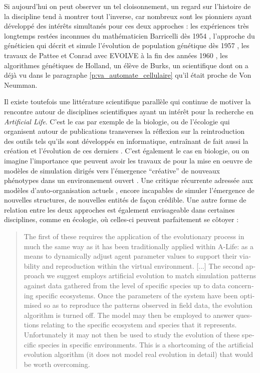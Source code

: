 Si aujourd'hui on peut observer un tel cloisonnement, un regard sur l'histoire de la discipline tend à montrer tout l'inverse, car nombreux sont les pionniers ayant développé des intérêts simultanés pour ces deux approches : les expériences très longtemps restées inconnues du mathématicien Barricelli dès 1954 , l'approche du généticien \textcite{Fraser1957} qui décrit et simule l'évolution de population génétique dès 1957 , les travaux de Pattee et Conrad avec EVOLVE à la fin des années 1960 \autocite{Conrad1970}, les algorithmes génétiques  de Holland, un élève de Burks, un scientifique dont on a déjà vu dans le paragraphe \ref{p:va_automate_cellulaire} qu'il était proche de Von Neumman.

Il existe toutefois une littérature scientifique parallèle qui continue de motiver la rencontre autour de disciplines scientifiques ayant un intérêt pour la recherche en \textit{Artificial Life}. C'est le cas par exemple de la biologie, ou de l'écologie \autocite{Hamblin2013} qui organisent autour de publications transverses la réflexion sur la reintroduction des outils tels qu'ils sont développés en informatique, entraînant de fait aussi la création et l'évolution de ces derniers \autocite{Hogeweg2011}. C'est également le cas en biologie, ou on imagine l'importance que peuvent avoir les travaux de \textcites{Taylor2001}[221]{Taylor1999} pour la mise en oeuvre de modèles de simulation dirigés vers l'émergence \enquote{créative} de nouveaux phénotypes dans un environnement ouvert \autocite[33]{Taylor1999}. Une critique récurrente adressée aux modèles d'auto-organisation actuels \autocite{Pumain2003}, encore incapables de simuler l'émergence de nouvelles structures, de nouvelles entités de façon crédible. Une autre forme de relation entre les deux approches est également envisageable dans certaines disciplines, comme en écologie, où celles-ci peuvent parfaitement se côtoyer :
\foreignblockquote{english}[\cite{Dorin2008}]{The first of these requires the application of the evolutionary process in much the same way as it has been traditionally applied within A-Life: as a means to dynamically adjust agent parameter values to support their viability and reproduction within the virtual environment. [...] The second approach we suggest employs artificial evolution to match simulation patterns against data gathered from the level of specific species up to data concerning specific ecosystems. Once the parameters of the system have been optimised so as to reproduce the patterns observed in field data, the evolution algorithm is turned off. The model may then be employed to answer questions relating to the specific ecosystem and species that it represents. Unfortunately it may not then be used to study the evolution of these specific species in specific environments. This is a shortcoming of the artificial evolution algorithm (it does not model real evolution in detail) that would be worth overcoming.}

